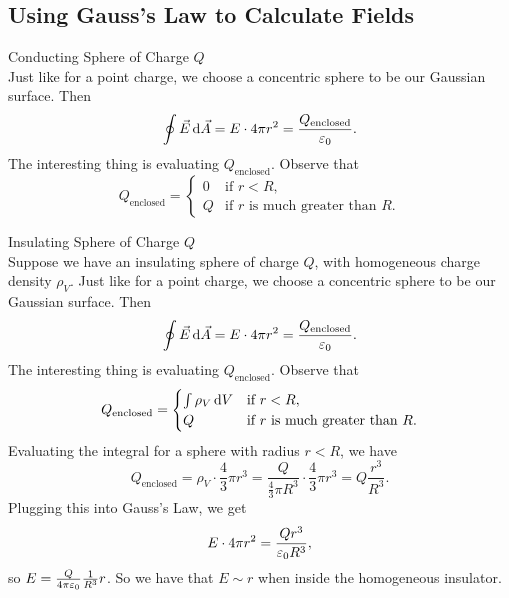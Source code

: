 \documentclass[class=article, crop=false]{standalone}
\begin{document}
  \subsection{Using Gauss's Law to Calculate Fields}
  \begin{example}{Conducting Sphere of Charge $Q$}\\
    Just like for a point charge, we choose a concentric sphere to be our Gaussian surface. Then
    \[
      \oint \vec{E} \,\mathrm{d}\vec{A} = E\cdot 4\pi r^2 = \frac{Q_{\text{enclosed}}}{\varepsilon_0}.
    \]
    The interesting thing is evaluating $Q_{\text{enclosed}}$. Observe that
    \[
      Q_{\text{enclosed}} = \begin{cases}0 & \text{if }r < R,\\Q & \text{if $r$ is much greater than $R$}.\end{cases}
    \]
  \end{example}
  \begin{example}{Insulating Sphere of Charge $Q$}\\
    Suppose we have an insulating sphere of charge $Q$, with homogeneous charge density $\rho_V$. Just like for a point charge, we choose a concentric sphere to be our Gaussian surface. Then
    \[
      \oint \vec{E} \,\mathrm{d}\vec{A} = E\cdot 4\pi r^2 = \frac{Q_{\text{enclosed}}}{\varepsilon_0}.
    \]
    The interesting thing is evaluating $Q_{\text{enclosed}}$. Observe that
    \[
      Q_{\text{enclosed}} = \begin{cases}\int\rho_V\,\mathrm{d}V & \text{if }r < R,\\Q & \text{if $r$ is much greater than $R$}.\end{cases}
    \]
    Evaluating the integral for a sphere with radius $r < R$, we have 
    \[
      Q_{\text{enclosed}} = \rho_V\cdot \frac{4}{3}\pi r^3 = \frac{Q}{\frac{4}{3}\pi R^3}\cdot \frac{4}{3}\pi r^3 = Q\frac{r^3}{R^3}.
    \] 
    Plugging this into Gauss's Law, we get 
    \[
      E\cdot 4\pi r^2 = \frac{Qr^3}{\varepsilon_0R^3},
    \]
    so $E = \frac{Q}{4\pi\varepsilon_0}\frac{1}{R^3}r$. So we have that $E\sim r$ when inside the homogeneous insulator.
  \end{example}
\end{document}
